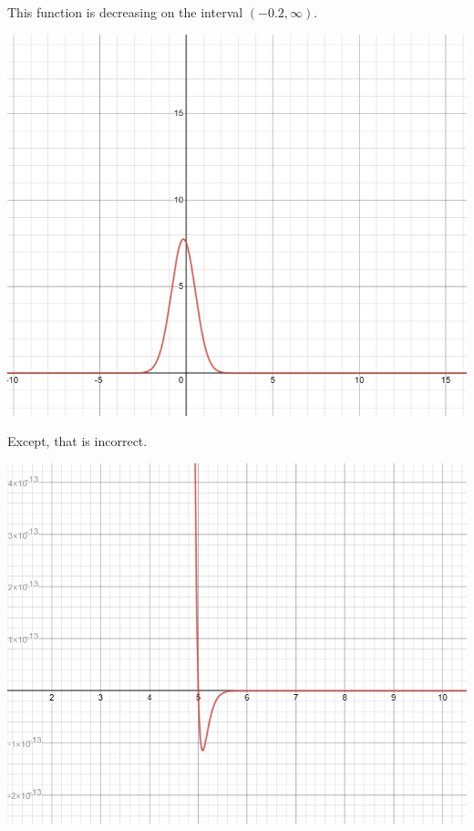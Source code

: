 \documentclass{ximera}
\begin{document}
\begin{example}


This function is decreasing on the interval $(-0.2, \infty)$.

\begin{image}
\includegraphics{pics/graph_3A.png}
\end{image}




Except, that is incorrect.

\begin{image}
\includegraphics{pics/graph_3B.png}
\end{image}



\end{example}
\end{document}
